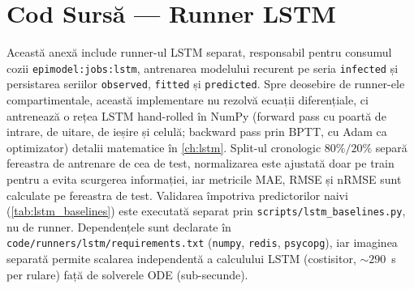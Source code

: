 \chapter{Cod Sursă --- Runner LSTM}
\label{app:cod_lstm}

Această anexă include runner-ul LSTM separat, responsabil pentru consumul
cozii \texttt{epimodel:jobs:lstm}, antrenarea modelului recurent pe seria
\texttt{infected} și persistarea seriilor \texttt{observed}, \texttt{fitted}
și \texttt{predicted}. Spre deosebire de runner-ele compartimentale, această
implementare nu rezolvă ecuații diferențiale, ci antrenează o rețea LSTM
hand-rolled în NumPy (forward pass cu poartă de intrare, de uitare, de
ieșire și celulă; backward pass prin BPTT, cu Adam ca optimizator)
\textemdash{} detalii matematice în \cref{ch:lstm}. Split-ul cronologic
$80\%/20\%$ separă fereastra de antrenare de cea de test, normalizarea este
ajustată doar pe train pentru a evita scurgerea informației, iar metricile
MAE, RMSE și nRMSE sunt calculate pe fereastra de test. Validarea împotriva
predictorilor naivi (\cref{tab:lstm_baselines}) este executată separat prin
\texttt{scripts/lstm\_baselines.py}, nu de runner. Dependențele sunt
declarate în \texttt{code/runners/lstm/requirements.txt} (\texttt{numpy},
\texttt{redis}, \texttt{psycopg}), iar imaginea separată permite scalarea
independentă a calculului LSTM (costisitor, $\sim$$290$~s per rulare) față
de solverele ODE (sub-secunde).


